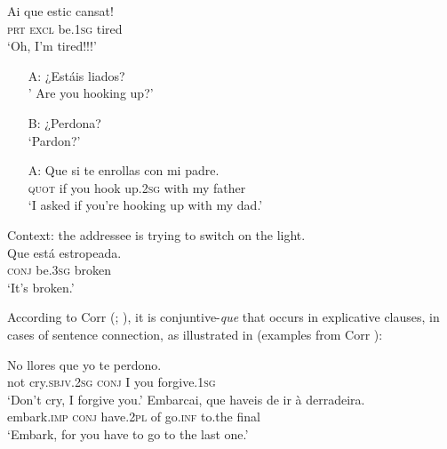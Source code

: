 \documentclass[output=paper,colorlinks,citecolor=brown,
]{langscibook}
\begin{document}
\ea \label{ex:matos:ai-cansat}
\settowidth{}
 \ea \label{ex:matos:ai-cansat-a}
 \gll Ai que estic cansat! \\	
	  \textsc{prt} \textsc{excl} be.\textsc{1sg} tired\\
 \glt ‘Oh, I’m tired!!!’
 \ex \label{ex:matos:estais-liados}
 \begin{itemize}
     \item[A:] ¿Estáis liados? \\
 '              Are you hooking up?’
     \item[B:] ¿Perdona?\\
                ‘Pardon?’
     \item[A:] \gll Que si te enrollas con mi padre.\\
	                \textsc{quot} if you {hook up}.\textsc{2sg} with my father\\
                \glt ‘I asked if you’re hooking up with my dad.’
 \end{itemize}
  \ex \label{ex:matos:estropeada}
 Context: the addressee is trying to switch on the light.\\
 \gll Que está estropeada.\\
	  \textsc{conj} be.\textsc{3sg} broken\\
 \glt ‘It’s broken.’
 \z
\z 
{}

According to Corr (\citeyear{corr_ibero-romance_2016}; \citeyear{corr_matrix_2018}), it is conjuntive-\textit{que} that occurs in explicative clauses, in cases of sentence connection, as illustrated in  (examples from Corr \citeyear[201]{corr_ibero-romance_2016}):

\ea \label{ex:matos:no-llores}
\settowidth{}
 \ea \label{ex:matos:no-llores-a}
 \gll No llores que yo te perdono. \\
	  not cry.\textsc{sbjv}.\textsc{2sg} \textsc{conj} I you forgive.\textsc{1sg}\\
 \glt ‘Don’t cry, I forgive you.’
 \ex \label{ex:matos:embarcai}
 \gll Embarcai, que haveis de ir à derradeira.{\footnotemark} \\
      embark.\textsc{imp} \textsc{conj} have.\textsc{2pl} of go.\textsc{inf} to.the final\\
 \glt ‘Embark, for you have to go to the last one.’
 \z
\z 
\end{document}
